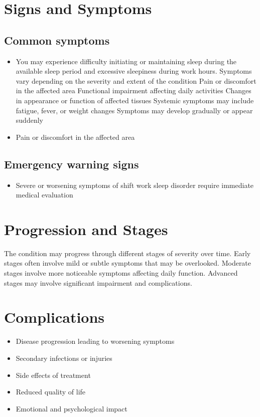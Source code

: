 \section{Signs and Symptoms}

\subsection{Common symptoms}
\begin{itemize}[noitemsep]
  \item You may experience difficulty initiating or maintaining sleep during the available sleep period and excessive sleepiness during work hours. Symptoms vary depending on the severity and extent of the condition Pain or discomfort in the affected area Functional impairment affecting daily activities Changes in appearance or function of affected tissues Systemic symptoms may include fatigue, fever, or weight changes Symptoms may develop gradually or appear suddenly
  \item Pain or discomfort in the affected area
  \end{itemize}

\subsection{Emergency warning signs}
\begin{itemize}[noitemsep]
  \item Severe or worsening symptoms of shift work sleep disorder require immediate medical evaluation
\end{itemize}
\section{Progression and Stages}
The condition may progress through different stages of severity over time. Early stages often involve mild or subtle symptoms that may be overlooked. Moderate stages involve more noticeable symptoms affecting daily function. Advanced stages may involve significant impairment and complications.
\section{Complications}
\begin{itemize}[noitemsep]
  \item Disease progression leading to worsening symptoms
  \item Secondary infections or injuries
  \item Side effects of treatment
  \item Reduced quality of life
  \item Emotional and psychological impact
\end{itemize}
